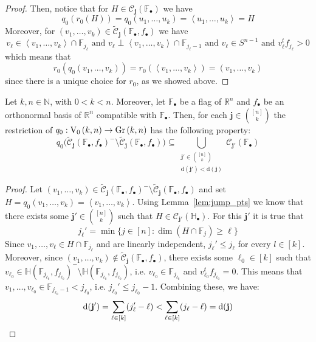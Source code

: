 \begin{proof}
Then, notice that for $H\in\mathcal{C}_{\mathbf{j}}(\mathbb{F}_{\bullet})$ we have
\[q_0(r_0(H))=q_0(u_1,\ldots,u_k)=\left<u_1,\ldots,u_k\right>=H\]
Moreover, for $(v_1,\ldots,v_k)\in\tilde{\mathcal{C}}_{\mathbf{j}}(\mathbb{F}_{\bullet},f_{\bullet})$ we have
\[v_{\ell}\in\left<v_1,\ldots,v_k\right>\cap\mathbb{F}_{j_{\ell}}\text{ and } v_{\ell}\perp\left<v_1,\ldots,v_k\right>\cap\mathbb{F}_{j_{\ell}-1}\text{ and }v_{\ell}\in S^{n-1}\text{ and }v_{\ell}^tf_{j_{\ell}}>0\]
which means that
\[r_0(q_0(v_1,\ldots,v_k))=r_0(\left<v_1,\ldots,v_k\right>)=(v_1,\ldots,v_k)\]
since there is a unique choice for $r_0$, as we showed above.
\end{proof}

\begin{lemma}\label{lem:q0_on_bdr} Let $k,n\in\mathbb{N}$, with $0<k<n$. Moreover, let $\mathbb{F}_{\bullet}$ be a flag of $\mathbb{R}^n$ and $f_{\bullet}$ be an orthonormal basis of $\mathbb{R}^n$ compatible with $\mathbb{F}_{\bullet}$. Then, for each $\mathbf{j}\in\binom{[n]}{k}$ the restriction of $q_0:\StO{k}{n}\to\Gr{k}{n}$ has the following property:
\[q_0\big(\tilde{\mathcal{C}}_{\mathbf{j}}(\mathbb{F}_{\bullet},f_{\bullet})^-\setminus\tilde{\mathcal{C}}_{\mathbf{j}}(\mathbb{F}_{\bullet},f_{\bullet})\big)\subseteq\bigcup_{\substack{\mathbf{j}'\in\binom{[n]}{k}\\\mathrm{d}(\mathbf{j}')<\mathrm{d}(\mathbf{j})}}\mathcal{C}_{\mathbf{j}'}(\mathbb{F}_{\bullet})\]
\end{lemma}
\begin{proof} Let $(v_1,\ldots,v_k)\in\tilde{\mathcal{C}}_{\mathbf{j}}(\mathbb{F}_{\bullet},f_{\bullet})^-\setminus\tilde{\mathcal{C}}_{\mathbf{j}}(\mathbb{F}_{\bullet},f_{\bullet})$ and set $H=q_0(v_1,\ldots,v_k)=\left<v_1,\ldots,v_k\right>$. Using Lemma~\ref{lem:jump_pts} we know that there exists some $\mathbf{j}'\in\binom{[n]}{k}$ such that $H\in\mathcal{C}_{\mathbf{j}'}(\mathbb{H}_{\bullet})$. For this $\mathbf{j}'$ it is true that
\[j_{\ell}'=\min\{j\in[n]:\dim(H\cap\mathbb{F}_j)\geq\ell\}\]
Since $v_1,\ldots,v_{\ell}\in H\cap\mathbb{F}_{j_{\ell}}$ and are linearly independent, $j_{\ell}'\leq j_{\ell}$ for every $l\in[k]$. Moreover, since $(v_1,\ldots,v_k)\not\in\tilde{\mathcal{C}}_{\mathbf{j}}(\mathbb{F}_{\bullet},f_{\bullet})$, there exists some $\ell_0\in[k]$ such that $v_{\ell_0}\in\mathbb{H}(\mathbb{F}_{j_{\ell_0}},f_{j_{\ell_0}})^-\setminus\mathbb{H}(\mathbb{F}_{j_{\ell_0}},f_{j_{\ell_0}})$, i.e. $v_{\ell_0}\in\mathbb{F}_{j_{\ell_0}}$ and $v_{\ell_0}^tf_{j_{\ell_0}}=0$. This means that $v_1,\ldots,v_{\ell_0}\in\mathbb{F}_{j_{\ell_0}-1}<j_{\ell_0}$, i.e. $j_{\ell_0}'\leq j_{\ell_0}-1$. Combining these, we have:
\[\mathrm{d}(\mathbf{j}')=\sum_{\ell\in[k]}(j'_{\ell}-\ell)<\sum_{\ell\in[k]}(j_{\ell}-\ell)=\mathrm{d}(\mathbf{j})\qedhere\]
\end{proof}

